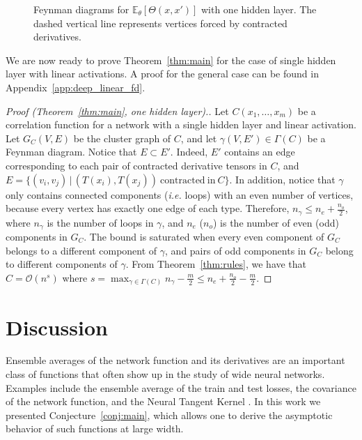 \documentclass[english]{article}
\newcommand{\cO}{\ensuremath{\mathcal{O}}}
\newcommand{\lexpp}[1]{\mathbb{E}_{#1}\left[}
\newcommand{\rexp}{\right]}
\newcommand{\pcite}[1]{\cite{#1}}
\begin{document}
\begin{figure}
\begin{subfigure}[b]{0.17\textwidth}
        \caption{}
        \label{fig:df_2_1hlb}
    \end{subfigure}
  \caption{Feynman diagrams for $\lexpp{\theta} \Theta(x,x') \rexp$ with one hidden layer. The dashed vertical line represents vertices forced by contracted derivatives.}
  \label{fig:ntk_sqr_1hl_0}
\end{figure}

We are now ready to prove Theorem~\ref{thm:main} for the case of single hidden layer with linear activations.
A proof for the general case can be found in Appendix~\ref{app:deep_linear_fd}.
\begin{proof}[Proof (Theorem~\ref{thm:main}, one hidden layer).]
  Let $C(x_1,\dots,x_m)$ be a correlation function for a network with a single hidden layer and linear activation.
  Let $G_C(V,E)$ be the cluster graph of $C$, and let $\gamma(V,E') \in \Gamma(C)$ be a Feynman diagram.
  Notice that $E \subset E'$.
  Indeed, $E'$ contains an edge corresponding to each pair of contracted derivative tensors in $C$, and $E=\{(v_i,v_j) \,|\, (T(x_i),T(x_j))\mathrm{~contracted~in~ }C\}$.
  In addition, notice that $\gamma$ only contains connected components (\emph{i.e.} loops) with an even number of vertices, because every vertex has exactly one edge of each type.
  Therefore, $n_\gamma \le n_e + \frac{n_o}{2}$, where $n_\gamma$ is the number of loops in $\gamma$, and $n_e$ ($n_o$) is the number of even (odd) components in $G_C$.
  The bound is saturated when every even component of $G_C$ belongs to a different component of $\gamma$, and pairs of odd components in $G_C$ belong to different components of $\gamma$.
  From Theorem~\ref{thm:rules}, we have that $C = \cO(n^s)$ where $s = \max_{\gamma \in \Gamma(C)} n_\gamma - \frac{m}{2} \le n_e + \frac{n_o}{2} - \frac{m}{2}$.
\end{proof}


\section{Discussion}

Ensemble averages of the network function and its derivatives are an important class of functions that often show up in the study of wide neural networks.
Examples include the ensemble average of the train and test losses, the covariance of the network function, and the Neural Tangent Kernel \pcite{ntk}.
In this work we presented Conjecture~\ref{conj:main}, which allows one to derive the asymptotic behavior of such functions at large width.
\end{document}
